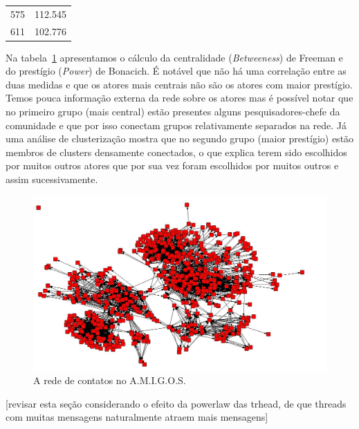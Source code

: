 \documentclass{article}
\begin{document}
\begin{table}[htbp]
\begin{boxedminipage}{\textwidth}
\begin{tabular}{| l | c |}
			575 & 112.545 \\
			611 & 102.776 \\
			\hline
		\end{tabular}
		\label{tab:acontccent}
\flushleft
\normalsize
Na tabela~\ref{tab:acontccent} apresentamos o cálculo da centralidade
(\textit{Betweeness}) de Freeman e do prestígio (\textit{Power}) de Bonacich.
É notável que não há uma correlação entre as duas medidas e que os atores mais
centrais não são os atores com maior prestígio. Temos pouca informação externa
da rede sobre os atores mas é possível notar que no primeiro grupo (mais
central) estão presentes alguns pesquisadores-chefe da comunidade e que por isso
conectam grupos relativamente separados na rede. Já uma análise de clusterização
mostra que no segundo grupo (maior prestígio) estão membros de clusters
densamente conectados, o que explica terem sido escolhidos por muitos outros
atores que por sua vez foram escolhidos por muitos outros e assim
sucessivamente.

	\end{boxedminipage}
\end{table}
\clearpage
\begin{figure}[h!]
  \caption{A rede de contatos no A.M.I.G.O.S.}
  \centering
    \includegraphics[width=\textwidth]{imgs/amigos-contatos.jpg}
\end{figure}

[revisar esta seção considerando o efeito da powerlaw das trhead, de que
threads com muitas mensagens naturalmente atraem mais mensagens]
\end{document}
